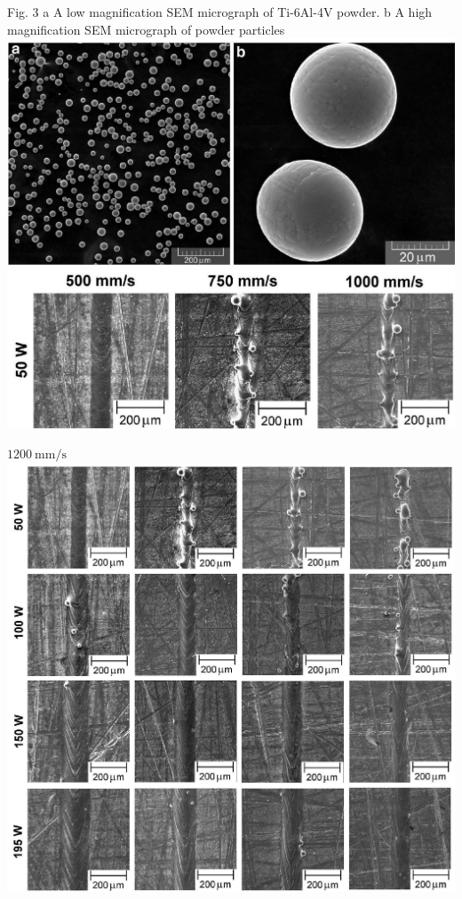 \documentclass[10pt]{article}
\begin{document}
Fig. 3 a A low magnification SEM micrograph of Ti-6Al-4V powder. b A high magnification SEM micrograph of powder particles\\
\includegraphics[max width=\textwidth, center]{2024_02_28_5b6806184856c64a957ag-04(1)}\\
\includegraphics[max width=\textwidth, center]{2024_02_28_5b6806184856c64a957ag-04}

$1200 \mathrm{~mm} / \mathrm{s}$\\
\includegraphics[max width=\textwidth, center]{2024_02_28_5b6806184856c64a957ag-04(2)}
\end{document}
